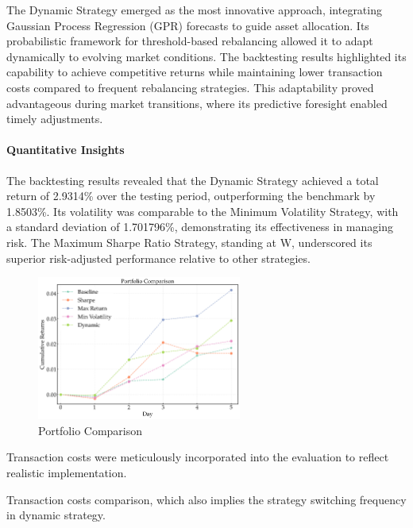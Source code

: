 The Dynamic Strategy emerged as the most innovative approach, integrating Gaussian Process Regression (GPR) forecasts to guide asset allocation. Its probabilistic framework for threshold-based rebalancing allowed it to adapt dynamically to evolving market conditions. The backtesting results highlighted its capability to achieve competitive returns while maintaining lower transaction costs compared to frequent rebalancing strategies. This adaptability proved advantageous during market transitions, where its predictive foresight enabled timely adjustments.
\paragraph{Quantitative Insights}
The backtesting results revealed that the Dynamic Strategy achieved a total return of 2.9314\% over the testing period, outperforming the benchmark by 1.8503\%. Its volatility was comparable to the Minimum Volatility Strategy, with a standard deviation of 1.701796\%, demonstrating its effectiveness in managing risk. The Maximum Sharpe Ratio Strategy, standing at W, underscored its superior risk-adjusted performance relative to other strategies.
\begin{figure}[htbp]
    \centering
    \includegraphics[width=0.6\textwidth]{figures/portfolio_comparison_final_non.png}
    \caption{Portfolio Comparison}
    \label{fig:portfolio_comparison_non_iterative}
\end{figure}

Transaction costs were meticulously incorporated into the evaluation to reflect realistic implementation. 

Transaction costs comparison, which also implies the strategy switching frequency in dynamic strategy.

